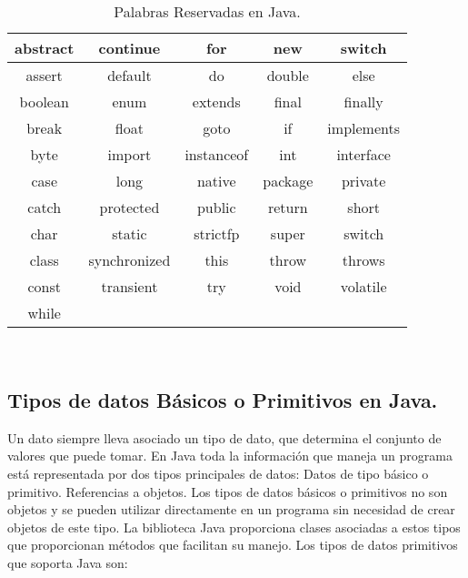 \begin{table}[H]
\centering
\begin{tabular}{ c | c | c | c | c }
	abstract & continue & for & new & switch \\ \hline
          assert & default & do & double & else \\ \hline
         boolean & enum & extends & final & finally \\ \hline
           break & float & goto & if & implements \\ \hline 
            byte & import & instanceof & int & interface \\ \hline
            case & long & native & package & private \\ \hline
           catch & protected & public & return & short \\ \hline 
            char & static & strictfp & super & switch \\ \hline
           class & synchronized & this & throw & throws \\ \hline
           const & transient & try & void & volatile \\ \hline
	   while & & & & \\ \hline 
\end{tabular}
\\
\caption{Palabras Reservadas en Java.}
\end{table}
\pagebreak

\subsection{Tipos de datos Básicos o Primitivos en Java.}
Un dato siempre lleva asociado un tipo de dato, que determina el conjunto de valores que puede tomar. En Java toda la información que maneja un programa está representada por dos tipos principales de datos: Datos de tipo básico o primitivo. Referencias a objetos. Los tipos de datos básicos o primitivos no son objetos y se pueden utilizar directamente en un programa sin necesidad de crear objetos de este tipo. La biblioteca Java proporciona clases asociadas a estos tipos que proporcionan métodos que facilitan su manejo. Los tipos de datos primitivos que soporta Java son:

